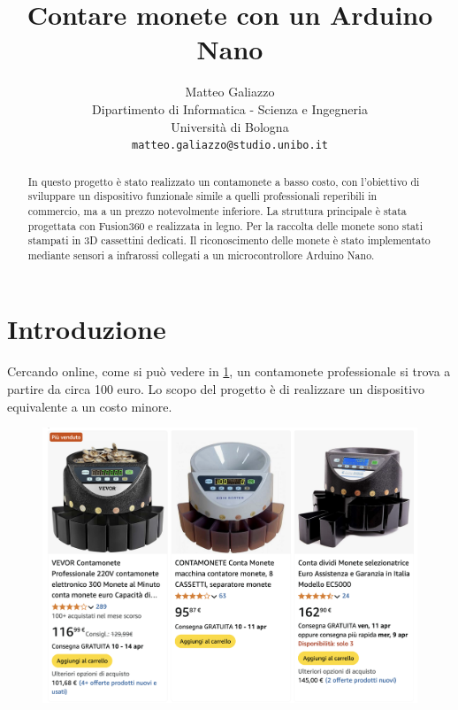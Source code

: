 \documentclass{article}
\title{Contare monete con un Arduino Nano}
\author{
 Matteo Galiazzo \\
  Dipartimento di Informatica - Scienza e Ingegneria\\
  Università di Bologna\\
  \texttt{matteo.galiazzo@studio.unibo.it} \\
}
\begin{document}
\maketitle
\begin{abstract}
In questo progetto è stato realizzato un contamonete a basso costo, con l'obiettivo di sviluppare un dispositivo funzionale simile a quelli professionali reperibili in commercio, ma a un prezzo notevolmente inferiore.  
La struttura principale è stata progettata con Fusion360 e realizzata in legno. Per la raccolta delle monete sono stati stampati in 3D cassettini dedicati.  
Il riconoscimento delle monete è stato implementato mediante sensori a infrarossi collegati a un microcontrollore Arduino Nano.  
\end{abstract}


\tableofcontents

\section{Introduzione}
Cercando online, come si può vedere in \ref{fig:contamonete_professionale}, un contamonete professionale si trova a partire da circa 100 euro.
Lo scopo del progetto è di realizzare un dispositivo equivalente a un costo minore.

\begin{figure}[h] %
  \centering
  \includegraphics[width=0.8\linewidth]{./images/contamonete_professionale.png}
  \caption{}
  \label{fig:contamonete_professionale}
\end{figure}
\end{document}
